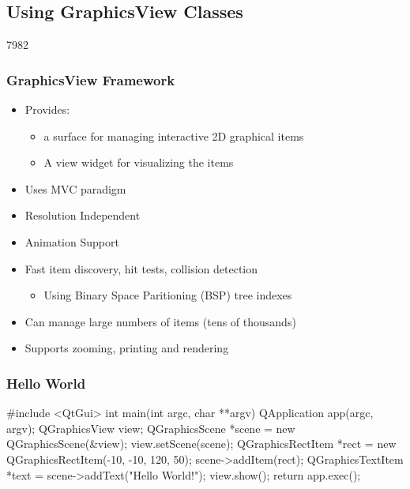 %
%
%
%

\subsection{Using GraphicsView Classes}
\begin{slide}{7982}
\frametitle{GraphicsView Framework}
\begin{itemize}
\item Provides:
    \begin{itemize}
    \item a surface for managing interactive 2D graphical items
    \item A view widget for visualizing the items
    \end{itemize}
\item Uses MVC paradigm
\item Resolution Independent
\item Animation Support
\item Fast item discovery, hit tests, collision detection
    \begin{itemize}
    \item Using Binary Space Paritioning (BSP) tree indexes
    \end{itemize}
\item Can manage large numbers of items (tens of thousands)
\item Supports zooming, printing and rendering

\end{itemize}
\end{slide}


\begin{slide}[fragile]
\frametitle{Hello World}

\begin{cpp}
#include <QtGui>
int main(int argc, char **argv) {
  QApplication app(argc, argv);
  QGraphicsView view;
  QGraphicsScene *scene = new QGraphicsScene(&view);
  view.setScene(scene);
  QGraphicsRectItem *rect = 
      new QGraphicsRectItem(-10, -10, 120, 50);
  scene->addItem(rect);
  QGraphicsTextItem *text = scene->addText("Hello World!");
  view.show();
  return app.exec();
}
\end{cpp}
 \\

\end{slide}

